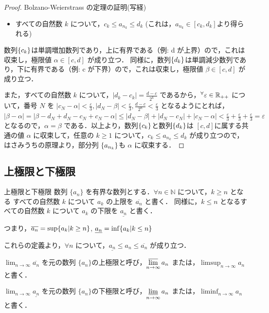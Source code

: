 \documentclass[a4paper]{ltjsarticle}
\begin{document}
\begin{proof}{Bolzano-Weierstrass の定理の証明(写経)}{}
\begin{itemize}
      \item すべての自然数 $k$ について，$c_k \leq a_{n_k} \leq d_k$ (これは，$a_{n_k} \in [c_k, d_k]$より得られる)
     \end{itemize}

     数列$\{c_k\}$は単調増加数列であり，上に有界である（例: d が上界）ので，これは収束し，極限値 $\alpha \in [c, d]$ が成り立つ．
     同様に，数列$\{d_k\}$は単調減少数列であり，下に有界である（例: c が下界）ので，これは収束し，極限値 $\beta \in [c, d]$ が成り立つ．

     また，すべての自然数 $k$ について，$|d_k - c_k| = \frac{d-c}{2^k}$ であるから，$\forall \varepsilon \in \R_{++}$ について，番号 $N$ を $|c_N - \alpha| < \frac{\varepsilon}{3}, |d_N - \beta| < \frac{\varepsilon}{3}, \frac{d - c}{2^n} < \frac{\varepsilon}{3}$ となるようにとれば，
     $|\beta - \alpha| = |\beta - d_N + d_N - c_N + c_N - \alpha| \leq |d_N - \beta| + |d_N - c_N| + |c_N - \alpha| < \frac{\varepsilon}{3} + \frac{\varepsilon}{3} + \frac{\varepsilon}{3} = \varepsilon$
     となるので，$\alpha = \beta$ である．以上より，数列$\{c_k\}$と数列$\{d_k\}$は $[c, d]$に属する共通の値 $\alpha$ に収束して，任意の $k \geq 1$ について，$c_k \leq a_{n_k} \leq d_k$ が成り立つので，はさみうちの原理より，部分列 $\{a_{n_k}\}$も $\alpha$ に収束する．
   \end{proof}

  \subsection{上極限と下極限}

  \begin{tcb}{上極限と下極限}{}
   数列 $\{a_n\}$ を有界な数列とする．$\forall n \in \mathbb{N}$ について，$k \geq n$ となる すべての自然数 $k$ について $a_k$ の上限を $\overline{a_n}$ と書く． 
   同様に，$k \leq n$ となるすべての自然数 $k$ について $a_k$ の下限を $\underline{a_n}$ と書く．

   つまり，$\overline{a_n} = {\sup\{a_k | k \geq n\}}$, $\underline{a_n} ={\inf\{a_k | k \leq n\}}$ 

   これらの定義より，$\forall n$ について，$\underline{a_n} \leq a_n \leq \overline{a_n}$ が成り立つ．

   $\displaystyle \lim_{n \to \infty} \overline{a_n}$ を元の数列 $\{a_n\} $の上極限と呼び，$\displaystyle \varlimsup_{n \to \infty} a_n$ または，$\displaystyle \limsup_{n \to \infty} a_n$ と書く．

   $\displaystyle \lim_{n \to \infty} \underline{a_n}$ を元の数列 $\{a_n\} $の下極限と呼び，$\displaystyle \varliminf_{n \to \infty} a_n$ または，$\displaystyle \liminf_{n \to \infty} a_n$ と書く．

  \end{tcb}
\end{document}
